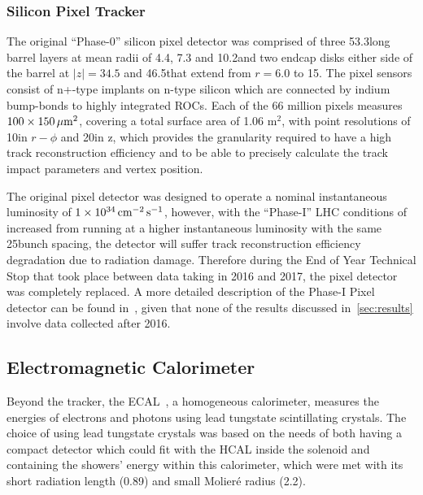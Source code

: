 \subsubsection{Silicon Pixel Tracker}
The original ``Phase-0'' silicon pixel detector was comprised of three 53.3\cm long barrel layers at mean radii of 4.4, 7.3 and 10.2\cm and two endcap disks either side of the barrel at $|z| = 34.5$ and 46.5\cm that extend from $r = 6.0$ to 15\cm.
The pixel sensors consist of n+-type implants  on n-type silicon which are connected by indium bump-bonds to highly integrated ROCs.
Each of the 66 million pixels measures $100 \times 150\,\mu\text{m}^{2}$, covering a total surface area of 1.06 m$^{2}$, with point resolutions of 10\mum in $r-\phi$ and 20\mum in z, which provides the granularity required to have a high track reconstruction efficiency and to be able to precisely calculate the track impact parameters and vertex position.

The original pixel detector was designed to operate a nominal instantaneous luminosity of $1 \times 10^{34}\,\text{cm}^\text{$-$2}\,\text{s}^\text{$-$1}$, however, with the ``Phase-I'' LHC conditions of increased \PU from running at a higher instantaneous luminosity with the same 25\ns bunch spacing, the detector will suffer track reconstruction efficiency degradation due to radiation damage.
Therefore during the End of Year Technical Stop that took place between data taking in 2016 and 2017, the pixel detector was completely replaced.
A more detailed description of the Phase-I Pixel detector can be found in~\cite{CMS:2012sda}, given that none of the results discussed in~\ref{sec:results} involve data collected after 2016.


\subsection{Electromagnetic Calorimeter}\label{subsec:ECAL}
Beyond the tracker, the ECAL~\cite{CMS:1997ysd,CMS:2002xia}, a homogeneous calorimeter, measures the energies of electrons and photons using lead tungstate scintillating crystals. 
The choice of using lead tungstate crystals was based on the needs of both having a compact detector which could fit with the HCAL inside the solenoid and containing the showers' energy within this calorimeter, which were met with its short radiation length (0.89\cm) and small Molier\'{e} radius (2.2\cm).

